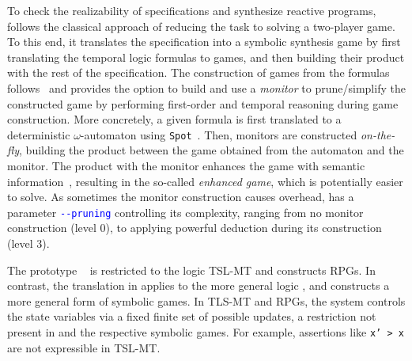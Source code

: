 To check the realizability of specifications and synthesize reactive programs, \issy follows the classical approach of reducing the task to solving a two-player game.
To this end, it translates the specification into a symbolic synthesis game by first translating the temporal logic formulas to games, and then building their product with the rest of the specification. 
The construction of games from the  formulas follows~\cite{HeimD25}  and provides the option to build and use a  \emph{monitor} to prune/simplify the constructed game by performing first-order and temporal  reasoning during game construction. 
More concretely, a given formula is first translated to a deterministic $\omega$-automaton using \texttt{Spot}~\cite{Duret-LutzRCRAS22}.  
Then, monitors are constructed \emph{on-the-fly}, building the product between the game obtained from the automaton and the monitor. 
The product with the monitor enhances the game with semantic information~\cite{HeimD25}, resulting in the so-called \emph{enhanced game}, which is potentially easier to solve. 
As sometimes the monitor construction causes overhead, \issy has a parameter \texttt{\textcolor{blue}{-{}-pruning}} controlling its complexity,  ranging from no monitor construction (level 0), to applying powerful deduction during its construction (level 3).

The prototype \tslmtrpg~\cite{HeimD25} is restricted to the logic TSL-MT and constructs RPGs. In contrast,  the translation in \issy applies to the more general logic \rpltl, and constructs a more general form of symbolic games.  
In TLS-MT and RPGs, the system controls the state variables via a fixed finite set of possible updates, a restriction not present in \rpltl{} and the respective symbolic games. 
For example,  assertions like \texttt{x' > x} are not expressible in TSL-MT.


